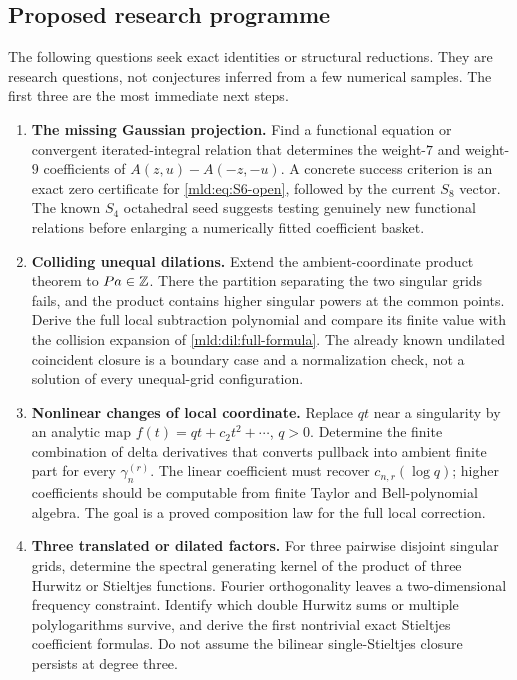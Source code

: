 \subsection{Proposed research programme}

The following questions seek exact identities or structural reductions.
They are research questions, not conjectures inferred from a few
numerical samples. The first three are the most immediate next steps.

\begin{enumerate}[label=\textbf{Q\arabic*.},leftmargin=2.7em]
\item \textbf{The missing Gaussian projection.}
Find a functional equation or convergent iterated-integral relation that
determines the weight-$7$ and weight-$9$ coefficients of
$A(z,u)-A(-z,-u)$. A concrete success criterion is an exact zero
certificate for \eqref{mld:eq:S6-open}, followed by the current $S_8$ vector.
The known $S_4$ octahedral seed suggests testing genuinely new functional
relations before enlarging a numerically fitted coefficient basket.

\item \textbf{Colliding unequal dilations.}
Extend the ambient-coordinate product theorem to $Pa\in\mathbb Z$. There the
partition separating the two singular grids fails, and the product
contains higher singular powers at the common points. Derive the full
local subtraction polynomial and compare its finite value with the
collision expansion of \eqref{mld:dil:full-formula}. The already known
undilated coincident closure is a boundary case and a normalization
check, not a solution of every unequal-grid configuration.

\item \textbf{Nonlinear changes of local coordinate.}
Replace $qt$ near a singularity by an analytic map
$f(t)=qt+c_2t^2+\cdots$, $q>0$. Determine the finite combination of
delta derivatives that converts pullback into ambient finite part for
every $\gamma_n^{(r)}$. The linear coefficient must recover
$c_{n,r}(\log q)$; higher coefficients should be computable from finite
Taylor and Bell-polynomial algebra. The goal is a proved composition
law for the full local correction.

\item \textbf{Three translated or dilated factors.}
For three pairwise disjoint singular grids, determine the spectral
generating kernel of the product of three Hurwitz or Stieltjes
functions. Fourier orthogonality leaves a two-dimensional frequency
constraint. Identify which double Hurwitz sums or multiple
polylogarithms survive, and derive the first nontrivial exact Stieltjes
coefficient formulas. Do not assume the bilinear single-Stieltjes
closure persists at degree three.


\end{enumerate}
